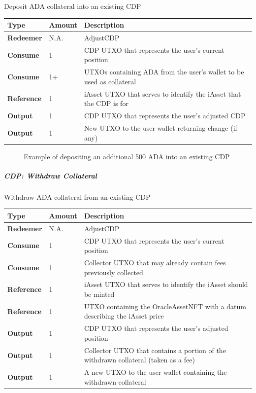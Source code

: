 \documentclass{article}
\begin{document}
\begin{sloppypar}
Deposit ADA collateral into an existing CDP

\begin{tabularx}{\linewidth}{l|l|L}
\toprule
\textbf{Type} & \textbf{Amount} & \textbf{Description}
\tabularnewline
\midrule
\endhead
\textbf{Redeemer} & N.A. & AdjustCDP
\tabularnewline
\midrule
\textbf{Consume} & 1 & CDP UTXO that represents the user's current
position
\tabularnewline
\midrule
\textbf{Consume} & 1+ & UTXOs containing ADA from the user's wallet to
be used as collateral
\tabularnewline
\midrule
\textbf{Reference} & 1 & iAsset UTXO that serves to identify the iAsset
that the CDP is for
\tabularnewline
\midrule
\textbf{Output} & 1 & CDP UTXO that represents the user's adjusted
CDP
\tabularnewline
\midrule
\textbf{Output} & 1 & New UTXO to the user wallet returning change (if
any)
\tabularnewline
\bottomrule
\end{tabularx}

\hypertarget{cdp-deposit-collateral-figure}{%
\begin{figure}[htbp]
\centering

\caption{Example of depositing an additional 500 ADA into an
existing CDP}
\label{cdp-deposit-collateral-figure}
\end{figure}}

\hypertarget{cdp-withdraw-collateral}{%
\subparagraph{CDP: Withdraw Collateral}\label{cdp-withdraw-collateral}}

Withdraw ADA collateral from an existing CDP

\begin{tabularx}{\linewidth}{l|l|L}
\toprule
\textbf{Type} & \textbf{Amount} & \textbf{Description}
\tabularnewline
\midrule
\endhead
\textbf{Redeemer} & N.A. & AdjustCDP
\tabularnewline
\midrule
\textbf{Consume} & 1 & CDP UTXO that represents the user's current
position
\tabularnewline
\midrule
\textbf{Consume} & 1 & Collector UTXO that may already contain fees
previously collected
\tabularnewline
\midrule
\textbf{Reference} & 1 & iAsset UTXO that serves to identify the iAsset
should be minted
\tabularnewline
\midrule
\textbf{Reference} & 1 & UTXO containing the OracleAssetNFT with a datum
describing the iAsset price
\tabularnewline
\midrule
\textbf{Output} & 1 & CDP UTXO that represents the user's adjusted
position
\tabularnewline
\midrule
\textbf{Output} & 1 & Collector UTXO that contains a portion of the
withdrawn collateral (taken as a fee)
\tabularnewline
\midrule
\textbf{Output} & 1 & A new UTXO to the user wallet containing the
withdrawn collateral
\tabularnewline
\bottomrule
\end{tabularx}


\end{sloppypar}
\end{document}
